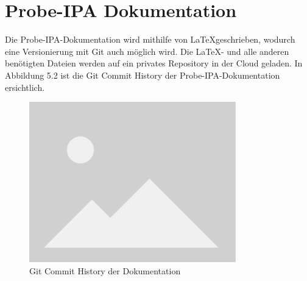 \section{Probe-IPA Dokumentation}
Die Probe-IPA-Dokumentation wird mithilfe von \LaTeX geschrieben, wodurch eine Versionierung mit Git auch möglich wird. Die \LaTeX- und alle anderen benötigten Dateien werden auf ein privates Repository in der Cloud geladen. In Abbildung 5.2 ist die Git Commit History der Probe-IPA-Dokumentation ersichtlich.

\begin{figure}[H]
	\begin{center}
		\includegraphics[width=0.8\textwidth]{ressourcen/placeholder}
		\caption[Git Commit History der Dokumentation]{Git Commit History der Dokumentation}\label{fig:Git-Commit-History-der-Dokumentation}
	\end{center}
\end{figure}